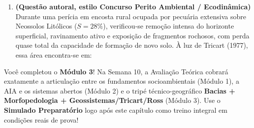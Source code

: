 \begin{enumerate}[leftmargin=1.8em, itemsep=5pt, start=16]
  \item \textbf{(Questão autoral, estilo Concurso Perito Ambiental / Ecodinâmica)} Durante uma perícia em encosta rural ocupada por pecuária extensiva sobre Neossolos Litólicos ($S = 28\%$), verificou-se remoção intensa do horizonte superficial, ravinamento ativo e exposição de fragmentos rochosos, com perda quase total da capacidade de formação de novo solo. À luz de Tricart (1977), essa área encontra-se em:
\end{enumerate}

\begin{boxDica}
Você completou o \textbf{Módulo 3}! Na Semana 10, a Avaliação Teórica cobrará exatamente a articulação entre os fundamentos socioambientais (Módulo 1), a AIA e os sistemas abertos (Módulo 2) e o tripé técnico-geográfico \textbf{Bacias + Morfopedologia + Geossistemas/Tricart/Ross} (Módulo 3). Use o \textbf{Simulado Preparatório} logo após este capítulo como treino integral em condições reais de prova!
\end{boxDica}

\clearpage
{}

